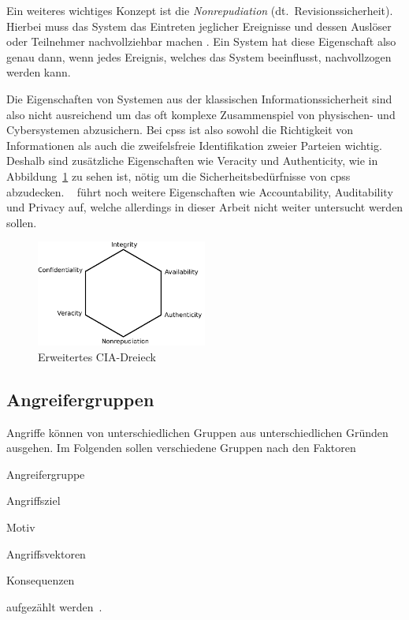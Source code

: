 \documentclass[final,bibliography=totocnumbered]{include/sikseminar}
\newcommand{\cps}{\glspl{cps}\xspace}
\begin{document}
Ein weiteres wichtiges Konzept ist die \textit{Nonrepudiation} (dt.\ Revisionssicherheit).
Hierbei muss das System das Eintreten jeglicher Ereignisse und dessen Auslöser oder Teilnehmer nachvollziehbar machen \cite{CH13}.
Ein System hat diese Eigenschaft also genau dann, wenn jedes Ereignis, welches das System beeinflusst, nachvollzogen werden kann. \label{def:nonrepudiation}

Die Eigenschaften von Systemen aus der klassischen Informationssicherheit sind also nicht ausreichend um das oft komplexe Zusammenspiel von physischen- und Cybersystemen abzusichern.
Bei \cps ist also sowohl die Richtigkeit von Informationen als auch die zweifelsfreie Identifikation zweier Parteien wichtig.
Deshalb sind zusätzliche Eigenschaften wie Veracity und Authenticity, wie in Abbildung~\ref{fig:triad} zu sehen ist, nötig um die Sicherheitsbedürfnisse von \cps abzudecken.
\citeauthor{CH13}~\cite{CH13} führt noch weitere Eigenschaften wie Accountability, Auditability und Privacy auf, welche allerdings in dieser Arbeit nicht weiter untersucht werden sollen.

\begin{figure}
    \centering
    \includegraphics[width=0.5\textwidth]{triad}
    \caption{Erweitertes CIA-Dreieck}
    \label{fig:triad}
\end{figure}





\subsection{Angreifergruppen}\label{subsec:angreifergruppen}

Angriffe können von unterschiedlichen Gruppen aus unterschiedlichen Gründen ausgehen.
Im Folgenden sollen verschiedene Gruppen nach den Faktoren
\begin{enumerate*}[label=(\alph*),before=\unskip{: }, itemjoin={{; }}, itemjoin*={{, und }}]
    \item Angreifergruppe\label{factor:angreifergruppe}
    \item Angriffsziel\label{factor:target}
    \item Motiv\label{factor:motiv}
    \item Angriffsvektoren\label{factor:methode}
    \item Konsequenzen\label{factor:konsequenz}
\end{enumerate*} aufgezählt werden~\cite{HLL+17}.
\end{document}
